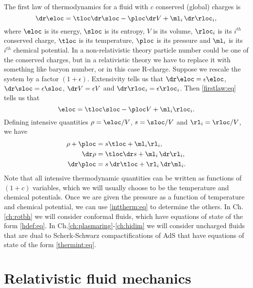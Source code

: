 The first law of thermodynamics for a fluid with $c$ conserved (global) charges is
%
\begin{equation}\label{firstlaw:eq}
  \dr\eloc = \tloc\dr\sloc - \ploc\dr V + \ml_i \,\dr\rloc_i,
\end{equation}
%
where $\eloc$ is its energy, $\sloc$ is its entropy, $V$ is its volume, $\rloc_i$ is its $i^{th}$  conserved charge, $\tloc$ is its temperature, $\ploc$ is its pressure and $\ml_i$ is its $i^{th}$ chemical potential. In a non-relativistic theory particle number could be one of the conserved charges, but in a relativistic theory we have to replace it with something like baryon number, or in this case R-charge.
Suppose we rescale the system by a factor $(1+\epsilon)$. Extensivity tells us that $\dr\eloc=\epsilon\eloc$, $\dr\sloc=\epsilon\sloc$, $\dr V=\epsilon V$ and $\dr\rloc_i=\epsilon\rloc_i$. Then \eqref{firstlaw:eq} tells us that
%
\begin{equation*}
  \eloc = \tloc\sloc - \ploc V + \ml_i \rloc_i.
\end{equation*}
%
Defining intensive quantities $\rho=\eloc/V$, $s=\sloc/V$ and $\rl_i=\rloc/V$, we have
%
\begin{equation}\label{inttherm:eq}
  \begin{split}
    \rho+\ploc &= s\tloc + \ml_i \rl_i, \\
    \dr\rho &= \tloc \dr s + \ml_i \,\dr \rl_i, \\
    \dr\ploc &= s\, \dr\tloc + \rl_i \,\dr\ml_i.
  \end{split}
\end{equation}
%
Note that all intensive thermodynamic quantities can be written as functions of $(1+c)$ variables, which we will usually choose to be the temperature and chemical potentials. Once we are given the pressure as a function of temperature and chemical potential, we can use \eqref{inttherm:eq} to determine the others. In Ch.\ref{ch:rotbh} we will consider conformal fluids, which have equations of state of the form \eqref{hdef:eq}. In Ch.\ref{ch:plasmaring}-\ref{ch:hidim} we will consider uncharged fluids that are dual to Scherk-Schwarz compactifications of AdS that have equations of state of the form \eqref{thermint:eq}.


\section{Relativistic fluid mechanics}\label{sec:fluid}



